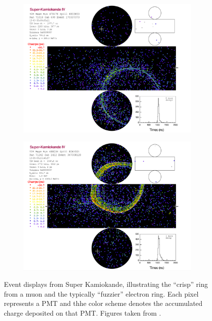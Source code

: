 \begin{figure}[h]
  \begin{subfigure}[t]{0.5\textwidth}
    \includegraphics[width=\textwidth, trim={0mm 0mm 0mm 0mm}, clip,page=1]{Figures/Selections/NuECandidate.pdf}
  \end{subfigure}%
  \begin{subfigure}[t]{0.5\textwidth}
    \includegraphics[width=\textwidth, trim={0mm 0mm 0mm 0mm}, clip,page=1]{Figures/Selections/NuMuCandidate.pdf}
    \subcaption{\quickmath{\nu_{\mu}}}
  \end{subfigure}
  \caption{Event displays from Super Kamiokande, illustrating the ``crisp'' ring from a muon and the typically ``fuzzier'' electron ring. Each pixel represents a PMT and thhe color scheme denotes the accumulated charge deposited on that PMT. Figures taken from \cite{t2k_tn_219}.}
  \label{fig:Selection_SKEventDisplays}
\end{figure}

